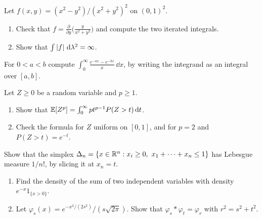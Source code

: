 \begin{notechapter}
\begin{exercise}\label{fubini:exr:3}
Let $f(x, y) = (x^2 - y^2)/(x^2 + y^2)^2$ on $(0, 1)^2$.
\begin{enumerate}[nosep]
  \item Check that
        $f = \frac{\partial}{\partial y}\bigl(\frac y{x^2 + y^2}\bigr)$
        and compute the two iterated integrals.
  \item Show that $\int\left|f\right|\,\mathrm{d}\lambda^2 = \infty$.
\end{enumerate}
\end{exercise}

\begin{exercise}\label{fubini:exr:4}
For $0 < a < b$ compute
$\displaystyle\int_0^\infty\frac{e^{-ax} - e^{-bx}}x\,\dd x$, by writing
the integrand as an integral over $[a, b]$.
\end{exercise}

\begin{exercise}\label{fubini:exr:5}
Let $Z\geq0$ be a random variable and $p\geq1$.
\begin{enumerate}[nosep]
  \item Show that
        $\mathbb{E}[Z^p] = \int_0^\infty pt^{p-1}P(Z > t)\,\mathrm{d} t$.
  \item Check the formula for $Z$ uniform on $[0, 1]$, and for $p = 2$
        and $P(Z > t) = e^{-t}$.
\end{enumerate}
\end{exercise}

\begin{exercise}\label{fubini:exr:6}
Show that the simplex
$\Delta_n = \{x\in\R^n : x_i\geq0,\ x_1 + \cdots + x_n\leq1\}$ has
Lebesgue measure $1/n!$, by slicing it at $x_n = t$.
\end{exercise}

\begin{exercise}\label{fubini:exr:7}
\begin{enumerate}[nosep]
  \item Find the density of the sum of two independent variables with
        density $e^{-x}1_{\{x > 0\}}$.
  \item Let $\varphi_s(x) = e^{-x^2/(2s^2)}/(s\sqrt{2\pi})$. Show that
        $\varphi_s*\varphi_t = \varphi_r$ with $r^2 = s^2 + t^2$.
\end{enumerate}
\end{exercise}


\end{notechapter}
